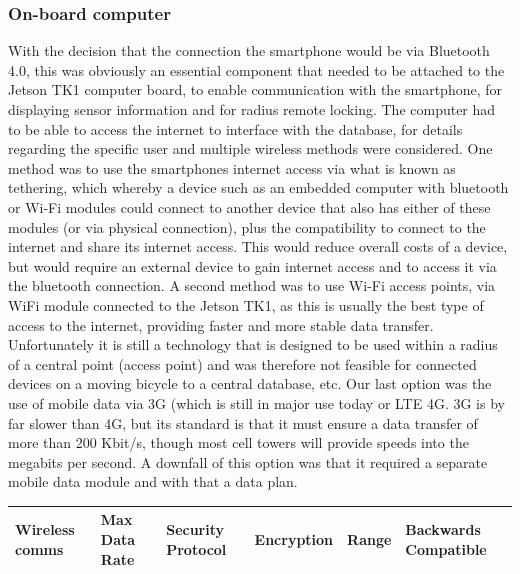 \documentclass[a4paper]{report}
\begin{document}
{\subsubsection{On-board computer}With the decision that the connection the smartphone would be via Bluetooth 4.0, this was obviously an essential component that needed to be attached to the Jetson TK1 computer board, to enable communication with the smartphone, for displaying sensor information and for radius remote locking. The computer had to be able to access the internet to interface with the database, for details regarding the specific user and multiple wireless methods were considered. One method was to use the smartphones internet access via what is known as tethering, which whereby a device such as an embedded computer with bluetooth or Wi-Fi modules could connect to another device that also has either of these modules (or via physical connection), plus the compatibility to connect to the internet and share its internet access. This would reduce overall costs of a device, but would require an external device to gain internet access and to access it via the bluetooth connection. A second method was to use Wi-Fi access points, via WiFi module connected to the Jetson TK1, as this is usually the best type of access to the internet, providing faster and more stable data transfer. Unfortunately it is still a technology that is designed to be used within a radius of a central point (access point) and was therefore not feasible for connected devices on a moving bicycle to a central database, etc. Our last option was the use of mobile data via 3G (which is still in major use today or LTE 4G. 3G is by far slower than 4G, but its standard is that it must ensure a data transfer of more than 200 Kbit/s, though most cell towers will provide speeds into the megabits per second. A downfall of this option was that it required a separate mobile data module and with that a data plan. 

\begin{landscape}

\begin{table}[h]

   \center
    \begin{tabular}{ | m{3cm} | m{3cm} | m{3.5cm} | m{3cm} | m{3cm} | m{2.5cm} |}
    \hline
    \textbf{Wireless comms} & \textbf{Max Data Rate} & \textbf{Security Protocol} & \textbf{Encryption} & \textbf{Range} & \textbf{Backwards Compatible}\\ \hline
   

\end{tabular}
\end{table}
\end{landscape}}
\end{document}

